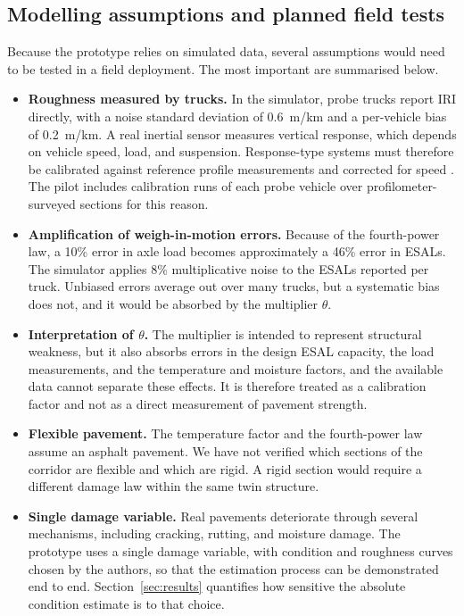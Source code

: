 \documentclass[11pt,a4paper]{article}
\begin{document}
\subsection{Modelling assumptions and planned field tests}\label{sec:assumptions}
Because the prototype relies on simulated data, several assumptions would need to be tested in a field deployment. The most important are summarised below.
\begin{itemize}
\item \textbf{Roughness measured by trucks.} In the simulator, probe trucks report IRI directly, with a noise standard deviation of 0.6~m/km and a per-vehicle bias of 0.2~m/km. A real inertial sensor measures vertical response, which depends on vehicle speed, load, and suspension. Response-type systems must therefore be calibrated against reference profile measurements and corrected for speed \cite{sayers}. The pilot includes calibration runs of each probe vehicle over profilometer-surveyed sections for this reason.
\item \textbf{Amplification of weigh-in-motion errors.} Because of the fourth-power law, a 10\% error in axle load becomes approximately a 46\% error in ESALs. The simulator applies 8\% multiplicative noise to the ESALs reported per truck. Unbiased errors average out over many trucks, but a systematic bias does not, and it would be absorbed by the multiplier $\theta$.
\item \textbf{Interpretation of $\theta$.} The multiplier is intended to represent structural weakness, but it also absorbs errors in the design ESAL capacity, the load measurements, and the temperature and moisture factors, and the available data cannot separate these effects. It is therefore treated as a calibration factor and not as a direct measurement of pavement strength.
\item \textbf{Flexible pavement.} The temperature factor and the fourth-power law assume an asphalt pavement. We have not verified which sections of the corridor are flexible and which are rigid. A rigid section would require a different damage law within the same twin structure.
\item \textbf{Single damage variable.} Real pavements deteriorate through several mechanisms, including cracking, rutting, and moisture damage. The prototype uses a single damage variable, with condition and roughness curves chosen by the authors, so that the estimation process can be demonstrated end to end. Section~\ref{sec:results} quantifies how sensitive the absolute condition estimate is to that choice.

\end{itemize}
\end{document}
